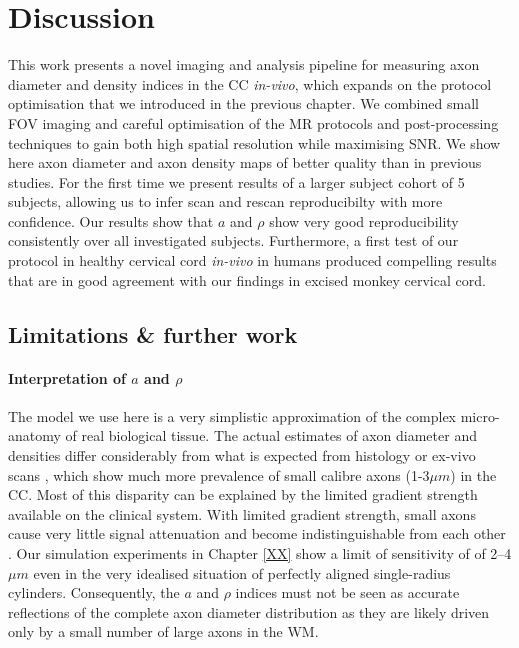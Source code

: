 \section{Discussion}
This work presents a novel imaging and analysis pipeline for measuring axon diameter and density indices in the \gls{CC} \emph{in-vivo}, which expands on the \SFasym{} protocol optimisation that we introduced in the previous chapter. We combined small \gls{FOV} imaging and careful optimisation of the MR protocols and post-processing techniques to gain both high spatial resolution while maximising \gls{SNR}. We show here axon diameter and axon density maps of better quality than in previous studies. For the first time we present results of a larger subject cohort of 5 subjects, allowing us to infer scan and rescan reproducibilty with more confidence. Our results show that $a$ and $\rho$ show very good reproducibility consistently over all investigated subjects. Furthermore, a first test of our protocol in healthy cervical cord \emph{in-vivo} in humans produced compelling results that are in good agreement with our findings in excised monkey cervical cord.

\subsection*{Limitations \& further work}
\paragraph{Interpretation of $a$ and $\rho$}The model we use here is a very simplistic approximation of the complex micro-anatomy of real biological tissue. The actual estimates of axon diameter and densities differ considerably from what is expected from histology or ex-vivo scans \citep{Alexander:2010}, which show much more prevalence of small calibre axons (1-3$\mu m$) in the \gls{CC}. Most of this disparity can be explained by the limited gradient strength available on the clinical system.  With limited gradient strength, small axons cause very little signal attenuation and become indistinguishable from each other \citep{Laett:2007,Yeh:2010}. Our simulation experiments in Chapter \ref{XX} show a limit of sensitivity of of 2--4$\mu m$ even in the very idealised situation of perfectly aligned single-radius cylinders. Consequently, the $a$ and $\rho$ indices must not be seen as accurate reflections of the complete axon diameter distribution as they are likely driven only by a small number of large axons in the WM. 

